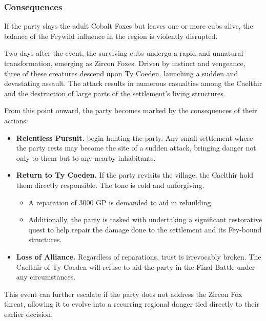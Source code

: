 \subsubsection*{Consequences}
{\entryfont If the party slays the adult Cobalt Foxes but leaves one or more cubs alive, the balance of the Feywild influence in the region is violently disrupted.

Two days after the event, the surviving cubs undergo a rapid and unnatural transformation, emerging as Zircon Foxes. Driven by instinct and vengeance, three of these creatures descend upon Ty Coeden, launching a sudden and devastating assault. The attack results in numerous casualties among the Caelthir and the destruction of large parts of the settlement's living structures.

From this point onward, the party becomes marked by the consequences of their actions:
\vfill\eject
\begin{itemize}\renewcommand\labelitemi{\textbf{\textbullet}}
	\item \textbf{Relentless Pursuit.} \hyperref[monster:ZirconFox]{} begin hunting the party. Any small settlement where the party rests may become the site of a sudden attack, bringing danger not only to them but to any nearby inhabitants.
	\item \textbf{Return to Ty Coeden.} If the party revisits the village, the Caelthir hold them directly responsible. The tone is cold and unforgiving.
	\begin{itemize}
		\item A reparation of 3000 GP is demanded to aid in rebuilding.
		\item Additionally, the party is tasked with undertaking a significant restorative quest to help repair the damage done to the settlement and its Fey-bound structures.
	\end{itemize}
	\item \textbf{Loss of Alliance.} Regardless of reparations, trust is irrevocably broken. The Caelthir of Ty Coeden will refuse to aid the party in the Final Battle under any circumstances.
\end{itemize}
This event can further escalate if the party does not address the Zircon Fox threat, allowing it to evolve into a recurring regional danger tied directly to their earlier decision.}

